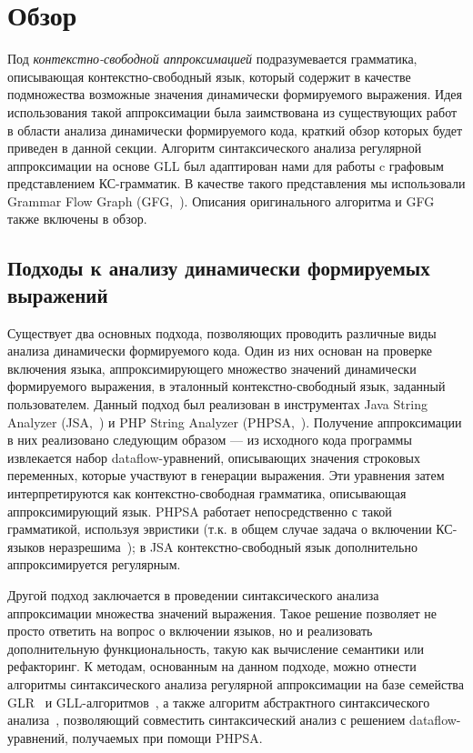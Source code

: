 \section{Обзор}

Под \textit{контекстно-свободной аппроксимацией} подразумевается грамматика, описывающая контекстно-свободный язык, который содержит в качестве подмножества возможные значения динамически формируемого выражения. 
Идея использования такой аппроксимации была заимствована из существующих работ в области анализа динамически формируемого кода, краткий обзор которых будет приведен в данной секции. 
Алгоритм синтаксического анализа регулярной аппроксимации на основе GLL был адаптирован нами для работы c графовым представлением КС-грамматик. 
В качестве такого представления мы использовали Grammar Flow Graph (GFG,~\cite{kovalev-spbu-gfg}). Описания оригинального алгоритма и GFG также включены в обзор. 

\subsection{Подходы к анализу динамически формируемых выражений}

Существует два основных подхода, позволяющих проводить различные виды анализа динамически формируемого кода. 
Один из них основан на проверке включения языка, аппроксимирующего множество значений динамически формируемого выражения, в эталонный контекстно-свободный язык, заданный пользователем. 
Данный подход был реализован в инструментах Java String Analyzer (JSA,~\cite{kovalev-spbu-jsa}) и PHP String Analyzer (PHPSA,~\cite{kovalev-spbu-phpsa}).
Получение аппроксимации в них реализовано следующим образом --- из исходного кода программы извлекается набор dataflow-уравнений, описывающих значения строковых переменных, которые участвуют в генерации выражения. 
Эти уравнения затем интерпретируются как контекстно-свободная грамматика, описывающая аппроксимирующий язык. 
PHPSA работает непосредственно с такой грамматикой, используя эвристики (т.к. в общем случае задача о включении КС-языков неразрешима~\cite{kovalev-spbu-lang_inclusion}); в JSA контекстно-свободный язык дополнительно аппроксимируется регулярным.

Другой подход заключается в проведении синтаксического анализа аппроксимации множества значений выражения. 
Такое решение позволяет не просто ответить на вопрос о включении языков, но и реализовать дополнительную функциональность, такую как вычисление семантики или рефакторинг. 
К методам, основанным на данном подходе, можно отнести алгоритмы синтаксического анализа регулярной аппроксимации на базе семейства GLR~\cite{kovalev-spbu-alvor, kovalev-spbu-rnglr_reg} и GLL-алгоритмов~\cite{kovalev-spbu-gll_reg}, а также алгоритм абстрактного синтаксического анализа~\cite{kovalev-spbu-a_lr}, позволяющий совместить синтаксический анализ с решением dataflow-уравнений, получаемых при помощи PHPSA.

